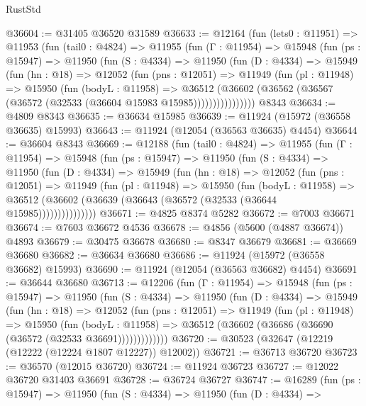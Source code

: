 \begin{lexlean}{RustStd}
\begin{coremodule}
@36604 := @31405 @36520 @31589
@36633 := @12164
    (fun (lets0 : @11951) =>
    @11953
      (fun (tail0 : @4824) =>
      @11955
        (fun (Γ : @11954) =>
        @15948
          (fun (ps : @15947) =>
          @11950
            (fun (S : @4334) =>
            @11950
              (fun (D : @4334) =>
              @15949
                (fun (hn : @18) =>
                @12052
                  (fun (pns : @12051) =>
                  @11949
                    (fun (pl : @11948) =>
                    @15950
                      (fun (bodyL : @11958) =>
                      @36512
                        (@36602
                          (@36562 (@36567 (@36572 (@32533 (@36604 @15983 @15985))))))))))))))))
    @8343
@36634 := @4809 @8343
@36635 := @36634 @15985
@36639 := @11924 (@15972 (@36558 @36635) @15993)
@36643 := @11924 (@12054 (@36563 @36635) @4454)
@36644 := @36604 @8343
@36669 := @12188
    (fun (tail0 : @4824) =>
    @11955
      (fun (Γ : @11954) =>
      @15948
        (fun (ps : @15947) =>
        @11950
          (fun (S : @4334) =>
          @11950
            (fun (D : @4334) =>
            @15949
              (fun (hn : @18) =>
              @12052
                (fun (pns : @12051) =>
                @11949
                  (fun (pl : @11948) =>
                  @15950
                    (fun (bodyL : @11958) =>
                    @36512 (@36602 (@36639 (@36643 (@36572 (@32533 (@36644 @15985)))))))))))))))
@36671 := @4825 @8374 @5282
@36672 := @7003 @36671
@36674 := @7603 @36672 @4536
@36678 := @4856 (@5600 (@4887 @36674)) @4893
@36679 := @30475 @36678
@36680 := @8347 @36679
@36681 := @36669 @36680
@36682 := @36634 @36680
@36686 := @11924 (@15972 (@36558 @36682) @15993)
@36690 := @11924 (@12054 (@36563 @36682) @4454)
@36691 := @36644 @36680
@36713 := @12206
    (fun (Γ : @11954) =>
    @15948
      (fun (ps : @15947) =>
      @11950
        (fun (S : @4334) =>
        @11950
          (fun (D : @4334) =>
          @15949
            (fun (hn : @18) =>
            @12052
              (fun (pns : @12051) =>
              @11949
                (fun (pl : @11948) =>
                @15950
                  (fun (bodyL : @11958) =>
                  @36512 (@36602 (@36686 (@36690 (@36572 (@32533 @36691)))))))))))))
@36720 := @30523 (@32647 (@12219 (@12222 (@12224 @1807 @12227)) @12002))
@36721 := @36713 @36720
@36723 := @36570 (@12015 @36720)
@36724 := @11924 @36723
@36727 := @12022 @36720 @31403 @36691
@36728 := @36724 @36727
@36747 := @16289
    (fun (ps : @15947) =>
    @11950
      (fun (S : @4334) =>
      @11950
        (fun (D : @4334) =>

\end{coremodule}
\end{lexlean}
